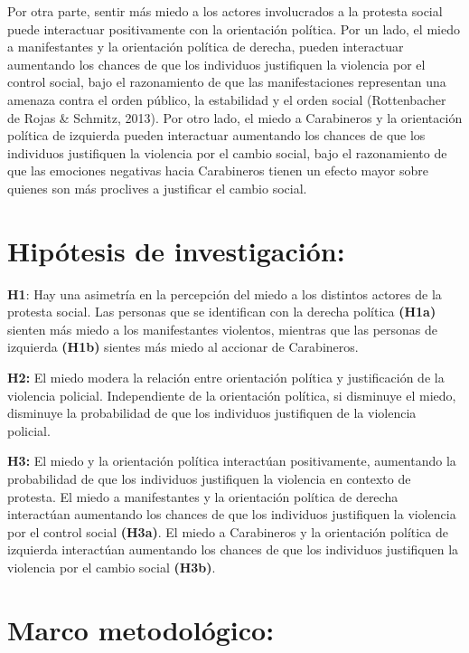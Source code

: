 \documentclass[12pt,twoside]{templates/facsothesis}
\begin{document}
Por otra parte, sentir más miedo a los actores involucrados a la protesta social puede interactuar positivamente con la orientación política. Por un lado, el miedo a manifestantes y la orientación política de derecha, pueden interactuar aumentando los chances de que los individuos justifiquen la violencia por el control social, bajo el razonamiento de que las manifestaciones representan una amenaza contra el orden público, la estabilidad y el orden social (Rottenbacher de Rojas \& Schmitz, 2013). Por otro lado, el miedo a Carabineros y la orientación política de izquierda pueden interactuar aumentando los chances de que los individuos justifiquen la violencia por el cambio social, bajo el razonamiento de que las emociones negativas hacia Carabineros tienen un efecto mayor sobre quienes son más proclives a justificar el cambio social.

\hypertarget{hipuxf3tesis-de-investigaciuxf3n}{%
\chapter{Hipótesis de investigación:}\label{hipuxf3tesis-de-investigaciuxf3n}}

\textbf{H1}: Hay una asimetría en la percepción del miedo a los distintos actores de la protesta social. Las personas que se identifican con la derecha política \textbf{(H1a)} sienten más miedo a los manifestantes violentos, mientras que las personas de izquierda \textbf{(H1b)} sientes más miedo al accionar de Carabineros.

\textbf{H2:} El miedo modera la relación entre orientación política y justificación de la violencia policial. Independiente de la orientación política, si disminuye el miedo, disminuye la probabilidad de que los individuos justifiquen de la violencia policial.

\textbf{H3:} El miedo y la orientación política interactúan positivamente, aumentando la probabilidad de que los individuos justifiquen la violencia en contexto de protesta. El miedo a manifestantes y la orientación política de derecha interactúan aumentando los chances de que los individuos justifiquen la violencia por el control social \textbf{(H3a)}. El miedo a Carabineros y la orientación política de izquierda interactúan aumentando los chances de que los individuos justifiquen la violencia por el cambio social \textbf{(H3b)}.

\hypertarget{marco-metodoluxf3gico}{%
\chapter{Marco metodológico:}\label{marco-metodoluxf3gico}}
\end{document}
